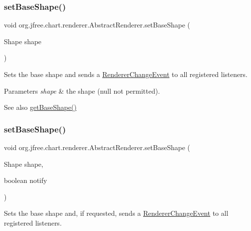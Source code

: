 \subsubsection{\texorpdfstring{set\+Base\+Shape()}{setBaseShape()}\hspace{0.1cm}{\footnotesize\ttfamily [1/2]}}
{\footnotesize\ttfamily void org.\+jfree.\+chart.\+renderer.\+Abstract\+Renderer.\+set\+Base\+Shape (\begin{DoxyParamCaption}\item[{Shape}]{shape }\end{DoxyParamCaption})}

Sets the base shape and sends a \mbox{\hyperlink{}{Renderer\+Change\+Event}} to all registered listeners.


\begin{DoxyParams}{Parameters}
{\em shape} & the shape ({\ttfamily null} not permitted).\\
\hline
\end{DoxyParams}
\begin{DoxySeeAlso}{See also}
\mbox{\hyperlink{classorg_1_1jfree_1_1chart_1_1renderer_1_1_abstract_renderer_a43dcca93629b149904310c59176c889a}{get\+Base\+Shape()}} 
\end{DoxySeeAlso}
\mbox{\label{classorg_1_1jfree_1_1chart_1_1renderer_1_1_abstract_renderer_a20a150379e1a4ce65892c2a3929e18f1}} 
\subsubsection{\texorpdfstring{set\+Base\+Shape()}{setBaseShape()}\hspace{0.1cm}{\footnotesize\ttfamily [2/2]}}
{\footnotesize\ttfamily void org.\+jfree.\+chart.\+renderer.\+Abstract\+Renderer.\+set\+Base\+Shape (\begin{DoxyParamCaption}\item[{Shape}]{shape,  }\item[{boolean}]{notify }\end{DoxyParamCaption})}

Sets the base shape and, if requested, sends a \mbox{\hyperlink{}{Renderer\+Change\+Event}} to all registered listeners.


